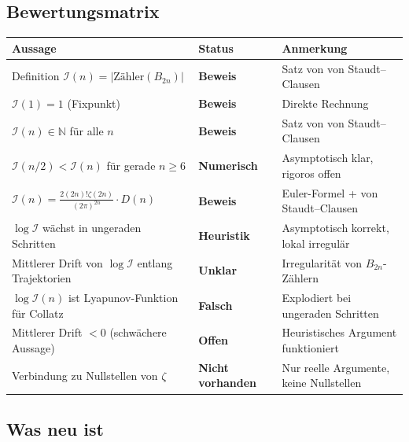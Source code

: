 \documentclass[12pt,a4paper]{article}
\newcommand{\N}{\mathbb{N}}
\newcommand{\abs}[1]{\lvert#1\rvert}
\newcommand{\In}{\mathcal{I}}      %
\newcommand{\Denom}[1]{D(#1)}     %
\begin{document}
\subsection{Bewertungsmatrix}

\begin{center}
\renewcommand{\arraystretch}{1.5}
\begin{tabular}{p{6.5cm} p{2.8cm} p{4cm}}
\toprule
\textbf{Aussage} & \textbf{Status} & \textbf{Anmerkung} \\
\midrule
Definition $\In(n) = \abs{\text{Zähler}(B_{2n})}$
  & \textcolor{bewiesengrün}{\bfseries Beweis}
  & Satz von von Staudt--Clausen \\
$\In(1) = 1$ (Fixpunkt)
  & \textcolor{bewiesengrün}{\bfseries Beweis}
  & Direkte Rechnung \\
$\In(n) \in \N$ für alle $n$
  & \textcolor{bewiesengrün}{\bfseries Beweis}
  & Satz von von Staudt--Clausen \\
$\In(n/2) < \In(n)$ für gerade $n \geq 6$
  & \textcolor{bewiesengrün}{\bfseries Numerisch}
  & Asymptotisch klar, rigoros offen \\
$\In(n) = \frac{2(2n)!\zeta(2n)}{(2\pi)^{2n}}\cdot\Denom{n}$
  & \textcolor{bewiesengrün}{\bfseries Beweis}
  & Euler-Formel + von Staudt--Clausen \\
\midrule
$\log\In$ wächst in ungeraden Schritten
  & \textcolor{warnorange}{\bfseries Heuristik}
  & Asymptotisch korrekt, lokal irregulär \\
Mittlerer Drift von $\log\In$ entlang Trajektorien
  & \textcolor{warnorange}{\bfseries Unklar}
  & Irregularität von $B_{2n}$-Zählern \\
\midrule
$\log\In(n)$ ist Lyapunov-Funktion für Collatz
  & \textcolor{lückenrot}{\bfseries Falsch}
  & Explodiert bei ungeraden Schritten \\
Mittlerer Drift $<0$ (schwächere Aussage)
  & \textcolor{lückenrot}{\bfseries Offen}
  & Heuristisches Argument funktioniert \\
Verbindung zu Nullstellen von $\zeta$
  & \textcolor{lückenrot}{\bfseries Nicht vorhanden}
  & Nur reelle Argumente, keine Nullstellen \\
\bottomrule
\end{tabular}
\end{center}

\subsection{Was neu ist}
\end{document}
